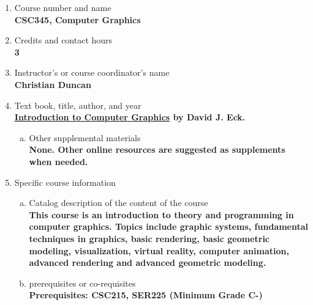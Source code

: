 \label{CSC345}  %
\begin{enumerate}[1.]
\item Course number and name\\
  {\bfseries
    CSC345, Computer Graphics
  }
  
\item Credits and contact hours\\
  {\bfseries
    3    
  }

\item Instructor's or course coordinator's name\\
  {\bfseries
    Christian Duncan    
  }

\item Text book, title, author, and year\\
  {\bfseries
\href{http://math.hws.edu/graphicsbook/}{Introduction to Computer Graphics} by David J. Eck.
  }
\begin{enumerate}[a.]
\item Other supplemental materials\\
  {\bfseries
    None. Other online resources are suggested as supplements when needed.
  }
\end{enumerate}

\item Specific course information
\begin{enumerate}[a.]  
\item Catalog description of the content of the course\\
  {\bfseries
This course is an introduction to theory and programming in computer graphics. Topics include graphic systems, fundamental techniques in graphics, basic rendering, basic geometric modeling, visualization, virtual reality, computer animation, advanced rendering and advanced geometric modeling.
}

\item prerequisites or co-requisites\\
  {\bfseries
    Prerequisites: CSC215, SER225 (Minimum Grade C-)
  }


\end{enumerate}
\end{enumerate}
